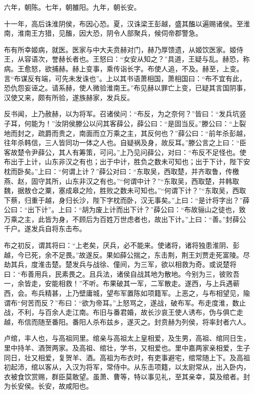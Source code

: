 \documentclass[12pt,UTF8]{ctexbook}
\begin{document}
六年，朝陈。七年，朝雒阳。九年，朝长安。



十一年，高后诛淮阴侯，布因心恐。夏，汉诛梁王彭越，盛其醢以遍赐诸侯。至淮南，淮南王方猎，见醢，因大恐，阴令人部聚兵，候伺帝郡警急。



布有所幸姬病，就医。医家与中大夫贲赫对门，赫乃厚馈遗，从姬饮医家。姬侍王，从容语次，誉赫长者也。王怒曰：“女安从知之？”具道，王疑与乱。赫恐，称病。王愈怒，欲捕赫。赫上变事，乘传诣长字。布使人追，不及。赫至，上变。言“布谋反有端，可先未发诛也”。上以其书语萧相国，萧相国曰：“布不宜有此，恐仇怨妄诬之。请系赫，使人微验淮南王。”布见赫以罪亡上变，已疑其言国阴事，汉使又来，颇有所验，遂族赫家，发兵反。



反书闻，上乃赦赫，以为将军。召诸侯问：“布反，为之奈何？”皆曰：“发兵坑竖子耳，何能为！”汝阴侯滕公以问其客薛公，薛公曰：“是固当反。”滕公曰：“上裂地而封之，疏爵而贵之，南面而立万乘之主，其反何也？”薛公曰：“前年杀彭越，往年杀韩信，三人皆同功一体之人也。自疑祸及身，故反耳。”滕公言之上曰：“臣客故楚令尹薛公，其人有筹策，可问。”上乃见问薛公，对曰：“布反不足怪也。使布出于上计，山东非汉之有也；出于中计，胜负之数未可知也；出于下计，陛下安枕而卧矣。”上曰：“何谓上计？”薛公对曰：“东取吴，西取楚，并齐取鲁，传檄燕、赵，固守其所，山东非汉之有也。”“何谓中计？”“东取吴，西取楚，并韩取魏，据敖仓之粟，塞成皋之险，胜败之数未可知也。”“何谓下计？”“东取吴，西取下蔡，归重于越，身归长沙，陛下字枕而卧，汉无事矣。”上曰：“是计将字出？”薛公曰：“出下计”。上曰：“胡为废上计而出下计？”薛公曰：“布故骊山之徒也，致万乘之主，此皆为身，不顾后为百姓万世虑者也，故出下计。”上曰：“善。”封薛公千户。遂发兵自将东击布。



布之初反，谓其将曰：“上老矣，厌兵，必不能来。使诸将，诸将独患淮阴、彭越，今已死，余不足畏。”故遂反。果如薛公揣之，东击荆，荆王刘贾走死富陵。尽劫其兵，度淮击楚。楚发兵与战徐、僮间，为三军，欲以相救为奇。或说楚将曰：“布善用兵，民素畏之。且兵法，诸侯自战其地为散地。今别为三，彼败吾一，余皆走，安能相救！”不听。布果破其一军，二军散走。遂西，与上兵遇蕲西，会。布兵精甚，上乃壁庸城，望布军置陈如项籍军。上恶之，与布相望见，隃谓布“何苦而反？”布曰：“欲为帝耳。”上怒骂之，遂战，破布军。布走度淮，数止战，不利，与百余人走江南。布旧与番君婚，故长沙哀王使人诱布，伪与俱亡走越，布信而随至番阳。番阳人杀布兹乡，遂灭之。封贲赫为列侯，将率封者六人。



卢绾，丰人也，与高祖同里。绾亲与高祖太上皇相爱，及生男，高祖、绾同日生，里中持羊、酒贺两家。及高祖、绾壮，学书，又相爱也。里中嘉两家亲相爱，生子同日，壮又相爱，复贺羊、酒。高祖为布衣时，有吏事避宅，绾常随上下。及高祖初起沛，绾以客从，入汉为将军，常侍中。从东击项籍，以太尉常从，出入卧内，衣被食饮赏赐，群臣莫敢望。虽萧、曹等，特以事见礼，至其亲幸，莫及绾者。封为长安侯。长安，故咸阳也。
\end{document}
